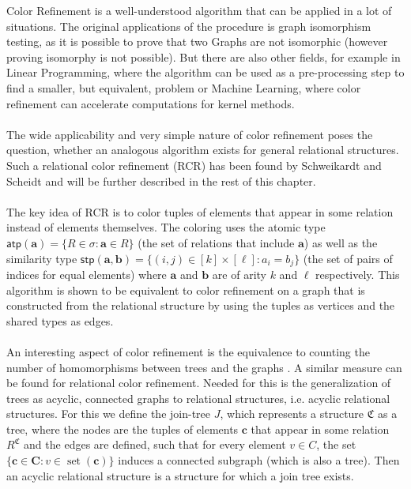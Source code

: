 \documentclass[a4paper,11pt,DIV=15]{scrartcl} %
\theoremstyle{plain}
\theoremstyle{definition}
\begin{document}
Color Refinement is a well-understood algorithm that can be applied in a lot of situations.
The original applications of the procedure is graph isomorphism testing, as it is possible to prove that two Graphs are not isomorphic (however proving isomorphy is not possible).
But there are also other fields, for example in Linear Programming, where the algorithm can be used as a pre-processing step to find a smaller, but equivalent, problem or Machine Learning, where color refinement can accelerate computations for kernel methods. \cite{grohe2021color}
\\ \\
The wide applicability and very simple nature of color refinement poses the question, whether an analogous algorithm exists for general relational structures.
Such a relational color refinement (RCR) has been found by Schweikardt and Scheidt \cite{scheidt2024color} and will be further described in the rest of this chapter.
\\ \\
The key idea of RCR is to color tuples of elements that appear in some relation instead of elements themselves. 
The coloring uses the atomic type $\mathsf{atp}(\mathbf{a})=\{R\in\sigma : \mathbf{a}\in R\}$ (the set of relations that include $\mathbf{a}$) as well as the similarity type $\mathsf{stp}(\mathbf{a},\mathbf{b})=\{(i,j)\in[k]\times[\ell] : a_i=b_j\}$ (the set of pairs of indices for equal elements) where $\mathbf{a}$ and $\mathbf{b}$ are of arity $k$ and $\ell$ respectively.
This algorithm is shown to be equivalent to color refinement on a graph that is constructed from the relational structure by using the tuples as vertices and the shared types as edges.
\\ \\
An interesting aspect of color refinement is the equivalence to counting the number of homomorphisms between trees and the graphs \cite{dvovrak2010recognizing}. A similar measure can be found for relational color refinement.
Needed for this is the generalization of trees as acyclic, connected graphs to relational structures, i.e. acyclic relational structures.
For this we define the join-tree $J$, which represents a structure $\mathfrak C$ as a tree, where the nodes are the tuples of elements $\mathbf c$ that appear in some relation $R^\mathfrak C$ and the edges are defined, such that for every element $v\in C$, the set $\{\mathbf{c}\in \mathbf{C} : v\in\operatorname{set}(\mathbf c)\}$ induces a connected subgraph (which is also a tree).
Then an acyclic relational structure is a structure for which a join tree exists.
\end{document}
